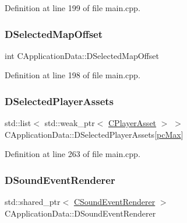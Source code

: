 Definition at line 199 of file main.\+cpp.

\hypertarget{classCApplicationData_a443edd0c2c7964fc51a82bf2a016725b}{}\label{classCApplicationData_a443edd0c2c7964fc51a82bf2a016725b} 
\subsubsection{\texorpdfstring{D\+Selected\+Map\+Offset}{DSelectedMapOffset}}
{\footnotesize\ttfamily int C\+Application\+Data\+::\+D\+Selected\+Map\+Offset\hspace{0.3cm}{\ttfamily [protected]}}



Definition at line 198 of file main.\+cpp.

\hypertarget{classCApplicationData_a05c1087d5a5c4ddc14fcb37444f1642b}{}\label{classCApplicationData_a05c1087d5a5c4ddc14fcb37444f1642b} 
\subsubsection{\texorpdfstring{D\+Selected\+Player\+Assets}{DSelectedPlayerAssets}}
{\footnotesize\ttfamily std\+::list$<$ std\+::weak\+\_\+ptr$<$ \hyperlink{classCPlayerAsset}{C\+Player\+Asset} $>$ $>$ C\+Application\+Data\+::\+D\+Selected\+Player\+Assets\mbox{[}\hyperlink{GameDataTypes_8h_aafb0ca75933357ff28a6d7efbdd7602fa594a5c8dd3987f24e8a0f23f1a72cd34}{pc\+Max}\mbox{]}\hspace{0.3cm}{\ttfamily [protected]}}



Definition at line 263 of file main.\+cpp.

\hypertarget{classCApplicationData_af2959556fc881145d9d777c627a9345d}{}\label{classCApplicationData_af2959556fc881145d9d777c627a9345d} 
\subsubsection{\texorpdfstring{D\+Sound\+Event\+Renderer}{DSoundEventRenderer}}
{\footnotesize\ttfamily std\+::shared\+\_\+ptr$<$ \hyperlink{classCSoundEventRenderer}{C\+Sound\+Event\+Renderer} $>$ C\+Application\+Data\+::\+D\+Sound\+Event\+Renderer\hspace{0.3cm}{\ttfamily [protected]}}



